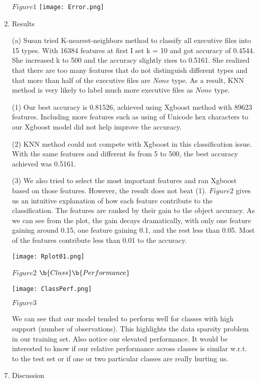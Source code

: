 \documentclass[12pt]{article}
\newcommand\tab[1][0.5cm]{\hspace*{#1}}
\begin{document}
\begin{enumerate}
$Figure 1$
\texttt{[image: Error.png]}
\newpage
\item
Results

\item[(a)]
\tab Susan tried K-nearest-neighbors method to classify all executive files into 15 types. With 16384 features at first I set k = 10 and got accuracy of 0.4544. She increased k to 500 and the accuracy slightly rises to 0.5161. She realized that there are too many features that do not distinguish different types and that more than half of the executive files are $None$ type. As a result, KNN method is very likely to label much more executive files as $None$ type.

\item[(1)]
\tab Our best accuracy is 0.81526, achieved using Xgboost method with 89623 features. Including more features such as using of Unicode hex characters to our Xgboost model did not help improve the accuracy. 

\item[(2)]
\tab KNN method could not compete with Xgboost in this classification issue. With the same features and different $k$s from 5 to 500, the best accuracy achieved was 0.5161.

\item[(3)]
\tab We also tried to select the most important features and ran Xgboost based on those features. However, the result does not beat (1). $Figure2$ gives us an intuitive explanation of how each feature contribute to the classification. The features are ranked by their gain to the object accuracy. As we can see from the plot, the gain decays dramatically, with only one feature gaining around 0.15, one feature gaining 0.1, and the rest less than 0.05. Most of the features contribute less than 0.01 to the accuracy. 

\texttt{[image: Rplot01.png]}

$Figure2$
\newpage
$\b{Class} \b{Performance}$

\texttt{[image: ClassPerf.png]}

$Figure3$

\tab We can see that our model tended to perform well for classes with high support (number of observations).  This highlights the data sparsity problem in our training set.  Also notice our elevated performance.  It would be interested to know if our relative performance across classes is similar w.r.t. to the test set or if one or two particular classes are really hurting us.


\item
Discussion


\end{enumerate}
\end{document}
